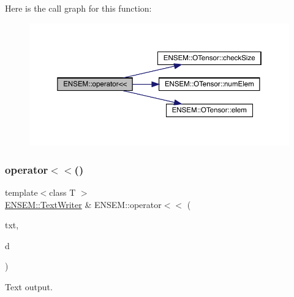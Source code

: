 Here is the call graph for this function\+:\nopagebreak
\begin{figure}[H]
\begin{center}
\leavevmode
\includegraphics[width=350pt]{de/d87/group__obstensor_gad4f1a718046854030a9c11c1a6d21712_cgraph}
\end{center}
\end{figure}
\mbox{\label{group__obstensor_ga64bc4e87abaefe7d97e074a4cb88e035}} 
\subsubsection{\texorpdfstring{operator$<$$<$()}{operator<<()}\hspace{0.1cm}{\footnotesize\ttfamily [2/3]}}
{\footnotesize\ttfamily template$<$class T $>$ \\
\mbox{\hyperlink{classENSEM_1_1TextWriter}{E\+N\+S\+E\+M\+::\+Text\+Writer}} \& E\+N\+S\+E\+M\+::operator$<$$<$ (\begin{DoxyParamCaption}\item[{\mbox{\hyperlink{classENSEM_1_1TextWriter}{E\+N\+S\+E\+M\+::\+Text\+Writer}} \&}]{txt,  }\item[{const \mbox{\hyperlink{classENSEM_1_1OTensor}{O\+Tensor}}$<$ T $>$ \&}]{d }\end{DoxyParamCaption})\hspace{0.3cm}{\ttfamily [inline]}}



Text output. 

